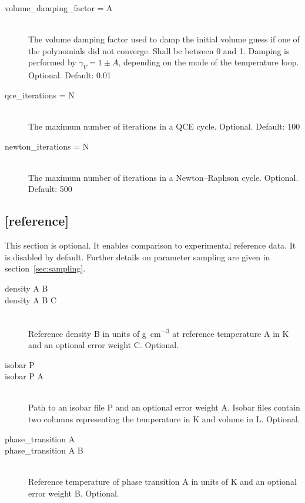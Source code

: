 \documentclass{scrartcl}
\begin{document}
\begin{description}
        \vspace{0.1cm}
    \item[volume\_damping\_factor = A] \hfill \\
        The volume damping factor used to damp the initial volume guess if one of the polynomials did not converge.
        Shall be between 0 and 1.
        Damping is performed by $\gamma_V = 1 \pm A$, depending on the mode of the temperature loop.
        Optional. Default: 0.01
        \vspace{0.1cm}
    \item[qce\_iterations = N] \hfill \\
        The maximum number of iterations in a QCE cycle.
        Optional. Default: 100
        \vspace{0.1cm}
    \item[newton\_iterations = N] \hfill \\
        The maximum number of iterations in a Newton--Raphson cycle.
        Optional. Default: 500
\end{description}

\subsection*{[reference]}
\vspace{-0.3cm}

This section is optional.
It enables comparison to experimental reference data.
It is disabled by default.
Further details on parameter sampling are given in section~\vref{sec:sampling}.

\begin{description}
    \item[density A B]
    \item[density A B C] \hfill \\
        Reference density B in units of \si{\gram\per\cubic\centi\meter} at reference temperature 
        A in \si{\kelvin} and an optional error weight C.
        Optional.
        \vspace{0.1cm}
    \item[isobar P]
    \item[isobar P A] \hfill \\
        Path to an isobar file P and an optional error weight A.
        Isobar files contain two columns representing the temperature in \si{\kelvin} and volume 
        in \si{\liter}.
        Optional.
        \vspace{0.1cm}
    \item[phase\_transition A]
    \item[phase\_transition A B] \hfill \\
        Reference temperature of phase transition A in units of \si{\kelvin} and an optional error 
        weight B.
        Optional.
\end{description}
\end{document}
